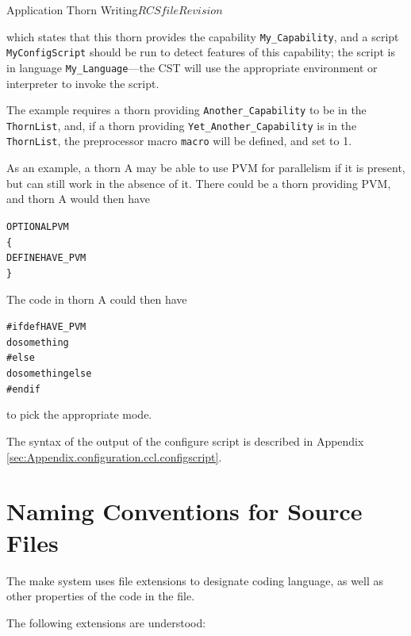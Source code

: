 \begin{cactuspart}{Application Thorn Writing}{$RCSfile$}{$Revision$}
\begin{alltt}
\end{alltt}

which states that this thorn provides the capability
\verb|My_Capability|, and a script \verb|MyConfigScript| should be run
to detect features of this capability; the script is in language
\verb|My_Language|---the CST will use the appropriate environment or
interpreter to invoke the script.

The example requires a thorn providing \verb|Another_Capability| to be
in the \texttt{ThornList}, and, if a thorn providing
\verb|Yet_Another_Capability| is in the \texttt{ThornList}, the preprocessor
macro \verb|macro| will be defined, and set to 1.

As an example, a thorn A may be able to use PVM for parallelism if it is
present, but can still work in the absence of it.  There could be a
thorn providing PVM, and thorn A would then have

\begin{alltt}
OPTIONAL PVM
\{
  DEFINE HAVE_PVM
\}

\end{alltt}

The code in thorn A could then have

\begin{alltt}

#ifdef HAVE_PVM
  do something
#else
  do something else
#endif

\end{alltt}

to pick the appropriate mode.

The syntax of the output of the configure script is described in
Appendix \ref{sec:Appendix.configuration.ccl.configscript}.



\section{Naming Conventions for Source Files}
\label{nacofosofi}

The make system uses file extensions to designate coding language,
as well as other properties of the code in the file.

The following extensions are understood:


\end{cactuspart}
